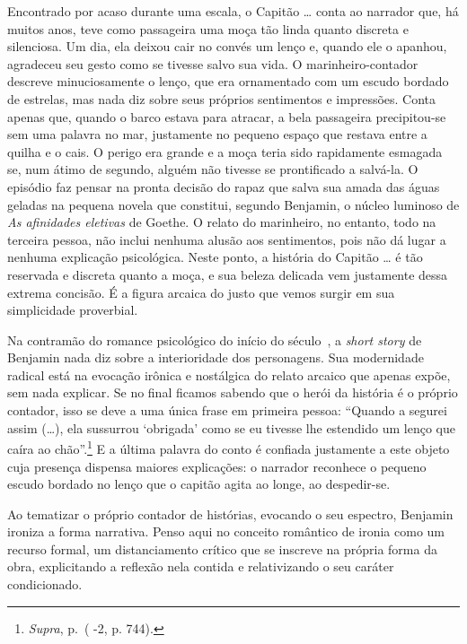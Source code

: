 Encontrado por acaso durante uma escala, o Capitão \ldots{} conta ao
narrador que, há muitos anos, teve como passageira uma moça tão linda
quanto discreta e silenciosa. Um dia, ela deixou cair no convés um lenço
e, quando ele o apanhou, agradeceu seu gesto como se tivesse salvo sua
vida. O marinheiro-contador descreve minuciosamente o lenço, que era
ornamentado com um escudo bordado de estrelas, mas nada diz sobre seus
próprios sentimentos e impressões. Conta apenas que, quando o barco
estava para atracar, a bela passageira precipitou-se sem uma palavra no
mar, justamente no pequeno espaço que restava entre a quilha e o cais. O
perigo era grande e a moça teria sido rapidamente esmagada se, num átimo
de segundo, alguém não tivesse se prontificado a salvá-la. O episódio
faz pensar na pronta decisão do rapaz que salva sua amada das águas
geladas na pequena novela que constitui, segundo Benjamin, o núcleo
luminoso de \emph{As afinidades eletivas} de Goethe. O relato do
marinheiro, no entanto, todo na terceira pessoa, não inclui nenhuma
alusão aos sentimentos, pois não dá lugar a nenhuma explicação
psicológica. Neste ponto, a história do Capitão \ldots{} é tão reservada e
discreta quanto a moça, e sua beleza delicada vem justamente dessa
extrema concisão. É a figura arcaica do justo que vemos surgir em sua
simplicidade proverbial.

Na contramão do romance psicológico do início do século~, a
\emph{short story} de Benjamin nada diz sobre a interioridade dos
personagens. Sua modernidade radical está na evocação irônica e
nostálgica do relato arcaico que apenas expõe, sem nada explicar. Se no
final ficamos sabendo que o herói da história é o próprio contador, isso
se deve a uma única frase em primeira pessoa: ``Quando a segurei assim
(\ldots{}), ela sussurrou `obrigada' como se eu tivesse lhe estendido um
lenço que caíra ao chão''.\footnote{\emph{Supra}, p.\,\pageref{supra9} ( -2, p. 744).}
E a última palavra do conto é confiada justamente a este objeto cuja
presença dispensa maiores explicações: o narrador reconhece o pequeno
escudo bordado no lenço que o capitão agita ao longe, ao despedir-se.

Ao tematizar o próprio contador de histórias, evocando o seu espectro,
Benjamin ironiza a forma narrativa. Penso aqui no conceito romântico de
ironia como um recurso formal, um distanciamento crítico que se inscreve
na própria forma da obra, explicitando a reflexão nela contida e
relativizando o seu caráter condicionado.

